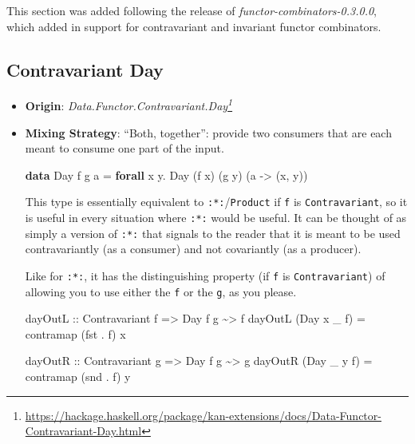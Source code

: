 \documentclass[]{article}
\newenvironment{Shaded}{}{}
\newcommand{\DataTypeTok}[1]{\textcolor[rgb]{0.56,0.13,0.00}{#1}}
\newcommand{\FunctionTok}[1]{\textcolor[rgb]{0.02,0.16,0.49}{#1}}
\newcommand{\KeywordTok}[1]{\textcolor[rgb]{0.00,0.44,0.13}{\textbf{#1}}}
\newcommand{\NormalTok}[1]{#1}
\newcommand{\OperatorTok}[1]{\textcolor[rgb]{0.40,0.40,0.40}{#1}}
\newcommand{\OtherTok}[1]{\textcolor[rgb]{0.00,0.44,0.13}{#1}}
\renewcommand{\href}[2]{#2\footnote{\url{#1}}}
\begin{document}
This section was added following the release of
\emph{functor-combinators-0.3.0.0}, which added in support for contravariant and
invariant functor combinators.

\subsection{Contravariant Day}\label{contravariant-day}

\begin{itemize}
\item
  \textbf{Origin}:
  \emph{\href{https://hackage.haskell.org/package/kan-extensions/docs/Data-Functor-Contravariant-Day.html}{Data.Functor.Contravariant.Day}}
\item
  \textbf{Mixing Strategy}: ``Both, together'': provide two consumers that are
  each meant to consume one part of the input.

\begin{Shaded}
\begin{Highlighting}[]
\KeywordTok{data} \DataTypeTok{Day}\NormalTok{ f g a }\OtherTok{=} \KeywordTok{forall}\NormalTok{ x y}\OperatorTok{.} \DataTypeTok{Day}\NormalTok{ (f x) (g y) (a }\OtherTok{{-}\textgreater{}}\NormalTok{ (x, y))}
\end{Highlighting}
\end{Shaded}

  This type is essentially equivalent to \texttt{:*:}/\texttt{Product} if
  \texttt{f} is \texttt{Contravariant}, so it is useful in every situation where
  \texttt{:*:} would be useful. It can be thought of as simply a version of
  \texttt{:*:} that signals to the reader that it is meant to be used
  contravariantly (as a consumer) and not covariantly (as a producer).

  Like for \texttt{:*:}, it has the distinguishing property (if \texttt{f} is
  \texttt{Contravariant}) of allowing you to use either the \texttt{f} or the
  \texttt{g}, as you please.

\begin{Shaded}
\begin{Highlighting}[]
\OtherTok{dayOutL ::} \DataTypeTok{Contravariant}\NormalTok{ f }\OtherTok{=\textgreater{}} \DataTypeTok{Day}\NormalTok{ f g }\OperatorTok{\textasciitilde{}\textgreater{}}\NormalTok{ f}
\NormalTok{dayOutL (}\DataTypeTok{Day}\NormalTok{ x \_ f) }\OtherTok{=}\NormalTok{ contramap (}\FunctionTok{fst} \OperatorTok{.}\NormalTok{ f) x}

\OtherTok{dayOutR ::} \DataTypeTok{Contravariant}\NormalTok{ g }\OtherTok{=\textgreater{}} \DataTypeTok{Day}\NormalTok{ f g }\OperatorTok{\textasciitilde{}\textgreater{}}\NormalTok{ g}
\NormalTok{dayOutR (}\DataTypeTok{Day}\NormalTok{ \_ y f) }\OtherTok{=}\NormalTok{ contramap (}\FunctionTok{snd} \OperatorTok{.}\NormalTok{ f) y}
\end{Highlighting}
\end{Shaded}


\end{itemize}
\end{document}
